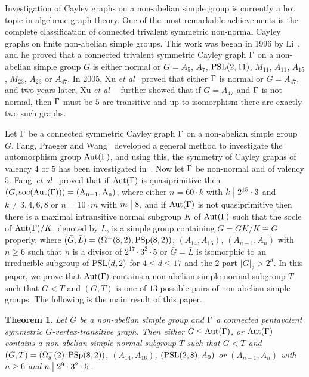 \documentclass[12pt]{article}
\newtheorem{theorem}[lem]{Theorem}%
\def\di{\bigm|} \def\lg{\langle} \def\rg{\rangle}
\def\PSL{\hbox{\rm PSL}}\def\PSU{\hbox{\rm PSU}}
\def\PSp{\hbox{\rm PSp}}\def\P\GammaL{\hbox{\rm P\Gamma L}} \def\ASIL{\hbox{\rm A\Sigma L}}
\def\Aut{\hbox{\rm Aut}}
\begin{document}
Investigation of Cayley graphs on a non-abelian simple group is currently a hot topic in algebraic graph theory. One of the most remarkable achievements is the complete classification of connected trivalent symmetric non-normal Cayley graphs on finite non-abelian simple groups. This work was began in 1996 by Li~\cite{CHLi}, and he proved that a connected trivalent symmetric Cayley graph $\Gamma$ on a non-abelian simple group $G$ is either normal or $G=A_5$, $A_7$, $\PSL(2,11)$, $M_{11}$, $A_{11}$, $A_{15}$, $M_{23}$, $A_{23}$ or $A_{47}$. In 2005, Xu {\em et al}~\cite{XFWX2005} proved that either $\Gamma$ is normal or $G= A_{47}$, and two years later, Xu {\em et al}~~\cite{XFWX} further showed that if $G=A_{47}$ and $\Gamma$ is not normal, then $\Gamma$ must be $5$-arc-transitive and up to isomorphism there are exactly two such graphs.

Let $\Gamma$ be a connected symmetric Cayley graph $\Gamma$ on a non-abelian simple group $G$. Fang, Praeger and Wang~\cite{FangP2} developed a general method to investigate the automorphism group $\Aut(\G)$, and using this, the symmetry of Cayley graphs of valency $4$ or $5$ has been investigated in~\cite{Fang4,Fang5}. Now let $\Gamma$ be non-normal and of valency $5$. Fang~{\em et al}~\cite{Fang5} proved that if $\Aut(\G)$ is quasiprimitive then $(G,\mathrm{soc}(\rm Aut(\Gamma)))=(A_{n-1}, A_n)$, where either $n=60\cdot k$ with $k\di  2^{15}\cdot3$ and $k \neq3, 4, 6, 8$ or $n = 10\cdot m$ with $m\di8$, and if $\Aut(\G)$ is not quasiprimitive then there is a maximal intransitive normal subgroup $K$ of $\Aut(\G)$  such that the socle of $\Aut(\G)/K $, denoted by $\bar{L}$, is a simple group containing $\bar{G}=GK/K\cong G$ properly, where $(\bar{G},\bar{L})=(\Omega^-(8,2),\rm PSp(8,2))$, $(A_{14},A_{16})$, $(A_{n-1},A_n)$ with $n\geq 6$ such that $n$ is a divisor of $2^{17}\cdot 3^2\cdot 5$ or $\bar{G}=\bar{L}$ is isomorphic to an irreducible subgroup of $\PSL(d,2)$ for $4\leq d \leq 17$ and the $2$-part $|G|_2>2^d$. In this paper, we prove that $\Aut(\G)$ contains a non-abelian simple normal subgroup $T$ such that $G<T$ and $(G,T)$ is one of $13$ possible pairs of non-abelian simple groups. The following is the main result of this paper.

\begin{theorem}\label{theo=main}
Let $G$ be a non-abelian simple group and $\Gamma$ a connected pentavalent symmetric $G$-vertex-transitive graph. Then either $G\unlhd \Aut(\G)$, or $\Aut(\G)$ contains a non-abelian simple normal subgroup $T$ such that $G<T$ and $(G,T)=(\Omega^-_8(2),\PSp(8,2))$, $(A_{14},A_{16})$, $(\PSL(2,8),A_{9})$ or $(A_{n-1},A_n)$ with $n\geq 6$ and $n\di 2^9\cdot3^2\cdot5$.
\end{theorem}
\end{document}

